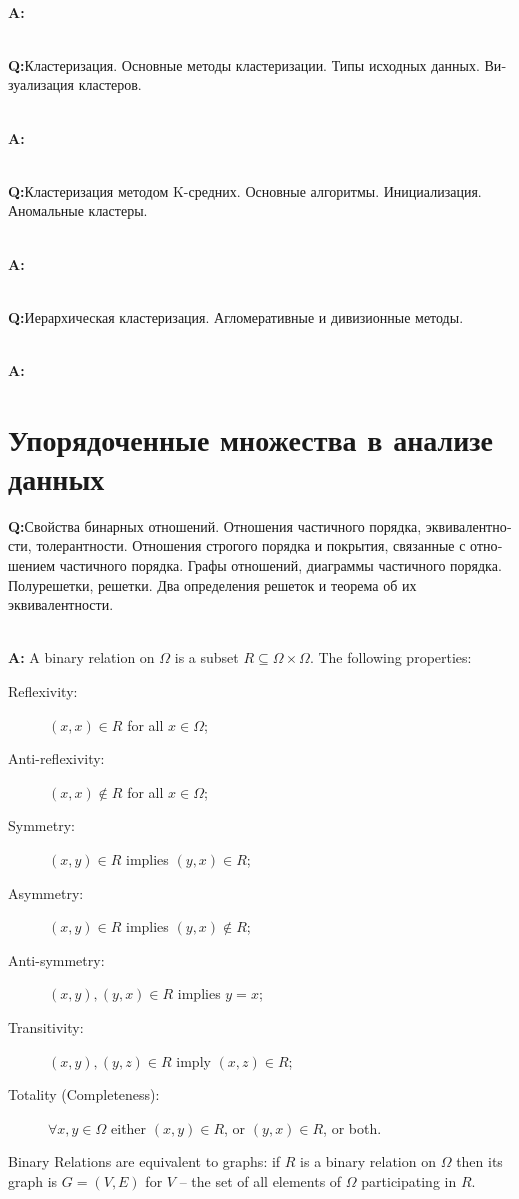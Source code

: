 \documentclass[a4paper]{article}
\newcommand{\rus}[1]{\foreignlanguage{russian}{#1}}
\begin{document}
\hfill\\\noindent\textbf{A:}

\hfill\\\noindent\textbf{Q:}\rus{Кластеризация. Основные методы кластеризации.
Типы исходных данных. Визуализация кластеров.}

\hfill\\\noindent\textbf{A:}

\hfill\\\noindent\textbf{Q:}\rus{Кластеризация методом K-средних. Основные алгоритмы.
Инициализация. Аномальные кластеры.}

\hfill\\\noindent\textbf{A:}

\hfill\\\noindent\textbf{Q:}\rus{Иерархическая кластеризация. Агломеративные и
дивизионные методы.}

\hfill\\\noindent\textbf{A:}



\section{\rus{Упорядоченные множества в анализе данных}} %
\label{sec:ordered_sets}

\noindent\textbf{Q:}\rus{Свойства бинарных отношений. Отношения частичного
порядка, эквивалентности, толерантности. Отношения строгого порядка и
покрытия, связанные с отношением частичного порядка. Графы отношений,
диаграммы частичного порядка. Полурешетки, решетки. Два определения решеток
и теорема об их эквивалентности.}

\hfill\\\noindent\textbf{A:}
A binary relation on $\Omega$ is a subset $R\subseteq \Omega\times \Omega$.
The following properties:
\begin{description}
    \item[Reflexivity:] $(x, x)\in R$ for all $x\in\Omega$;
    \item[Anti-reflexivity:] $(x, x)\notin R$ for all $x\in\Omega$;
    \item[Symmetry:] $(x, y)\in R$ implies $(y, x)\in R$;
    \item[Asymmetry:] $(x, y)\in R$ implies $(y, x)\notin R$;
    \item[Anti-symmetry:] $(x, y), (y,x)\in R$ implies $y=x$;
    \item[Transitivity:] $(x,y), (y,z)\in R$ imply $(x,z)\in R$;
    \item[Totality (Completeness):] $\forall x, y\in \Omega$ either $(x,y)\in R$,
    or $(y,x)\in R$, or both.
\end{description}
Binary Relations are equivalent to graphs: if $R$ is a binary relation on $\Omega$
then its graph is $G = (V, E)$ for $V$ -- the set of all elements of $\Omega$
participating in $R$.
\end{document}

